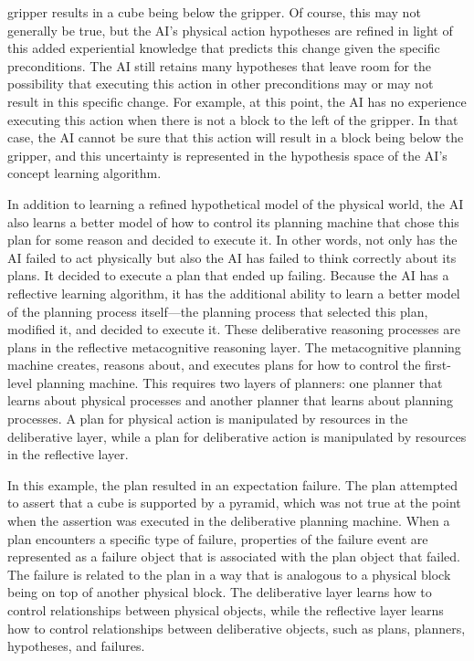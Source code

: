 gripper results in a cube being below the gripper.  Of course, this
may not generally be true, but the AI's physical action hypotheses are
refined in light of this added experiential knowledge that predicts
this change given the specific preconditions.  The AI still retains
many hypotheses that leave room for the possibility that executing
this action in other preconditions may or may not result in this
specific change.  For example, at this point, the AI has no experience
executing this action when there is not a block to the left of the
gripper.  In that case, the AI cannot be sure that this action will
result in a block being below the gripper, and this uncertainty is
represented in the hypothesis space of the AI's concept learning
algorithm.

In addition to learning a refined hypothetical model of the physical
world, the AI also learns a better model of how to control its
planning machine that chose this plan for some reason and decided to
execute it.  In other words, not only has the AI failed to act
physically but also the AI has failed to think correctly about its
plans.  It decided to execute a plan that ended up failing.  Because
the AI has a reflective learning algorithm, it has the additional
ability to learn a better model of the planning process itself---the
planning process that selected this plan, modified it, and decided to
execute it.  These deliberative reasoning processes are plans in the
reflective metacognitive reasoning layer.  The metacognitive planning
machine creates, reasons about, and executes plans for how to control
the first-level planning machine.  This requires two layers of
planners: one planner that learns about physical processes and another
planner that learns about planning processes.  A plan for physical
action is manipulated by resources in the deliberative layer, while a
plan for deliberative action is manipulated by resources in the
reflective layer.

In this example, the plan resulted in an expectation failure.  The
plan attempted to assert that a cube is supported by a pyramid, which
was not true at the point when the assertion was executed in the
deliberative planning machine.  When a plan encounters a specific type
of failure, properties of the failure event are represented as a
failure object that is associated with the plan object that failed.
The failure is related to the plan in a way that is analogous to a
physical block being on top of another physical block.  The
deliberative layer learns how to control relationships between
physical objects, while the reflective layer learns how to control
relationships between deliberative objects, such as plans, planners,
hypotheses, and failures.


